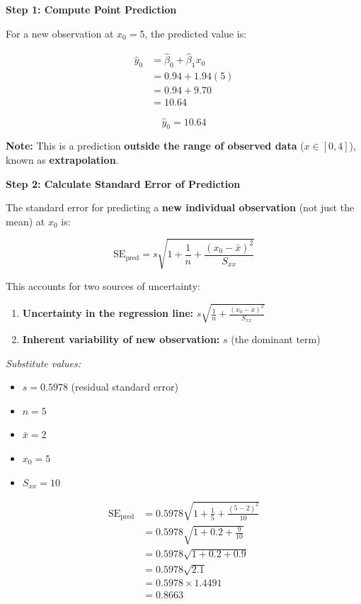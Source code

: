 \documentclass[12pt]{article}
\begin{document}
\begin{solution}
\textbf{Step 1: Compute Point Prediction}

For a new observation at $x_0 = 5$, the predicted value is:

\begin{align*}
\hat{y}_0 &= \hat{\beta}_0 + \hat{\beta}_1 x_0 \\
&= 0.94 + 1.94(5) \\
&= 0.94 + 9.70 \\
&= 10.64
\end{align*}

\[
\boxed{\hat{y}_0 = 10.64}
\]

\textbf{Note:} This is a prediction \textbf{outside the range of observed data} ($x \in [0,4]$), known as \textbf{extrapolation}.

\textbf{Step 2: Calculate Standard Error of Prediction}

The standard error for predicting a \textbf{new individual observation} (not just the mean) at $x_0$ is:

\[
\text{SE}_{\text{pred}} = s \sqrt{1 + \frac{1}{n} + \frac{(x_0 - \bar{x})^2}{S_{xx}}}
\]

This accounts for two sources of uncertainty:
\begin{enumerate}
    \item \textbf{Uncertainty in the regression line:} $s\sqrt{\frac{1}{n} + \frac{(x_0 - \bar{x})^2}{S_{xx}}}$
    \item \textbf{Inherent variability of new observation:} $s$ (the dominant term)
\end{enumerate}

\textit{Substitute values:}
\begin{itemize}
    \item $s = 0.5978$ (residual standard error)
    \item $n = 5$
    \item $\bar{x} = 2$
    \item $x_0 = 5$
    \item $S_{xx} = 10$
\end{itemize}

\begin{align*}
\text{SE}_{\text{pred}} &= 0.5978 \sqrt{1 + \frac{1}{5} + \frac{(5-2)^2}{10}} \\
&= 0.5978 \sqrt{1 + 0.2 + \frac{9}{10}} \\
&= 0.5978 \sqrt{1 + 0.2 + 0.9} \\
&= 0.5978 \sqrt{2.1} \\
&= 0.5978 \times 1.4491 \\
&= 0.8663
\end{align*}


\end{solution}
\end{document}
